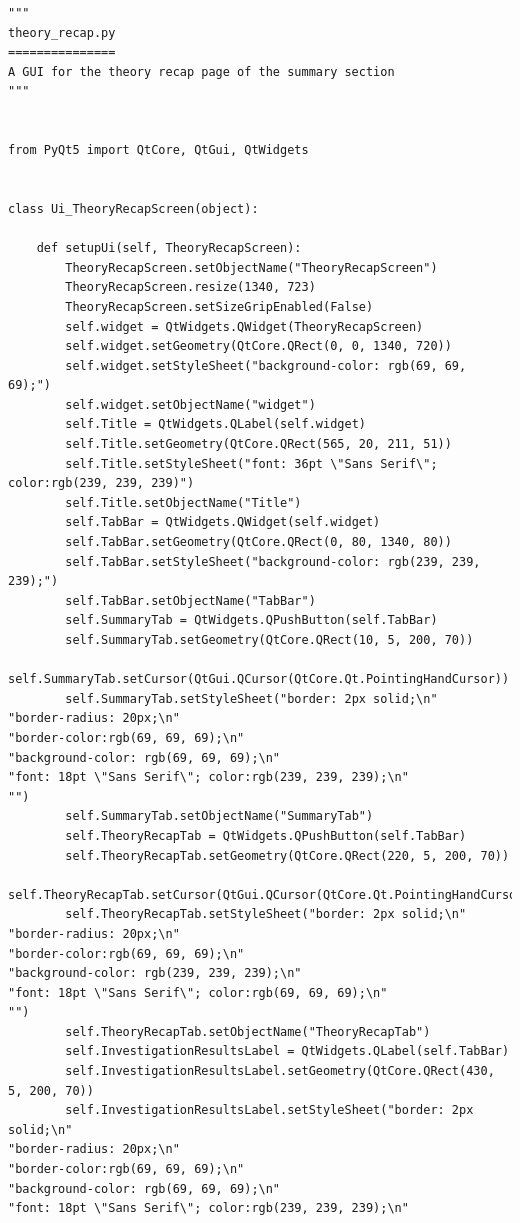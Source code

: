 \documentclass{article}
\begin{document}
\begin{lstlisting}
"""
theory_recap.py
===============
A GUI for the theory recap page of the summary section
"""


from PyQt5 import QtCore, QtGui, QtWidgets


class Ui_TheoryRecapScreen(object):

    def setupUi(self, TheoryRecapScreen):
        TheoryRecapScreen.setObjectName("TheoryRecapScreen")
        TheoryRecapScreen.resize(1340, 723)
        TheoryRecapScreen.setSizeGripEnabled(False)
        self.widget = QtWidgets.QWidget(TheoryRecapScreen)
        self.widget.setGeometry(QtCore.QRect(0, 0, 1340, 720))
        self.widget.setStyleSheet("background-color: rgb(69, 69, 69);")
        self.widget.setObjectName("widget")
        self.Title = QtWidgets.QLabel(self.widget)
        self.Title.setGeometry(QtCore.QRect(565, 20, 211, 51))
        self.Title.setStyleSheet("font: 36pt \"Sans Serif\"; color:rgb(239, 239, 239)")
        self.Title.setObjectName("Title")
        self.TabBar = QtWidgets.QWidget(self.widget)
        self.TabBar.setGeometry(QtCore.QRect(0, 80, 1340, 80))
        self.TabBar.setStyleSheet("background-color: rgb(239, 239, 239);")
        self.TabBar.setObjectName("TabBar")
        self.SummaryTab = QtWidgets.QPushButton(self.TabBar)
        self.SummaryTab.setGeometry(QtCore.QRect(10, 5, 200, 70))
        self.SummaryTab.setCursor(QtGui.QCursor(QtCore.Qt.PointingHandCursor))
        self.SummaryTab.setStyleSheet("border: 2px solid;\n"
"border-radius: 20px;\n"
"border-color:rgb(69, 69, 69);\n"
"background-color: rgb(69, 69, 69);\n"
"font: 18pt \"Sans Serif\"; color:rgb(239, 239, 239);\n"
"")
        self.SummaryTab.setObjectName("SummaryTab")
        self.TheoryRecapTab = QtWidgets.QPushButton(self.TabBar)
        self.TheoryRecapTab.setGeometry(QtCore.QRect(220, 5, 200, 70))
        self.TheoryRecapTab.setCursor(QtGui.QCursor(QtCore.Qt.PointingHandCursor))
        self.TheoryRecapTab.setStyleSheet("border: 2px solid;\n"
"border-radius: 20px;\n"
"border-color:rgb(69, 69, 69);\n"
"background-color: rgb(239, 239, 239);\n"
"font: 18pt \"Sans Serif\"; color:rgb(69, 69, 69);\n"
"")
        self.TheoryRecapTab.setObjectName("TheoryRecapTab")
        self.InvestigationResultsLabel = QtWidgets.QLabel(self.TabBar)
        self.InvestigationResultsLabel.setGeometry(QtCore.QRect(430, 5, 200, 70))
        self.InvestigationResultsLabel.setStyleSheet("border: 2px solid;\n"
"border-radius: 20px;\n"
"border-color:rgb(69, 69, 69);\n"
"background-color: rgb(69, 69, 69);\n"
"font: 18pt \"Sans Serif\"; color:rgb(239, 239, 239);\n"

\end{lstlisting}
\end{document}
